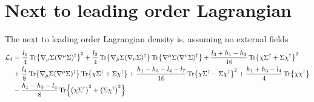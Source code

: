 \section{Next to leading order Lagrangian}

The next to leading order Lagrangian density is, assuming no external fields
\begin{align}
    \notag
    \mathcal{L}_4 
    & = 
    \frac{l_1}{4} \Tr{\nabla_\mu \Sigma (\nabla^\mu \Sigma)^\dagger}^2
    + \frac{l_2}{4} \Tr{\nabla_\mu \Sigma (\nabla_\nu \Sigma)^\dagger} 
    \Tr{\nabla^\mu \Sigma (\nabla^\nu \Sigma)^\dagger} 
    +
    \frac{l_3 + h_1 - h_3 }{16} \Tr{\chi \Sigma^\dagger + \Sigma \chi^\dagger}^2
    \\ \notag
    &
    + \frac{l_4}{8}\Tr{\nabla_\mu \Sigma (\nabla^\mu \Sigma)^\dagger} \Tr{\chi \Sigma^\dagger + \Sigma \chi^\dagger}
    + \frac{h_1 - h_3 - l_4-l_7}{16} \Tr{\chi \Sigma^\dagger - \Sigma \chi^\dagger}^2
    + \frac{h_1 + h_3 - l_4}{4} \Tr{\chi \chi^\dagger} \\
    & -
    \frac{h_1 - h_3 - l_4}{8} 
        \Tr{\left(\chi \Sigma^\dagger\right)^2 + \left( \Sigma \chi^\dagger\right)^2}
    \label{NLO Lagrangian}
\end{align}
 
